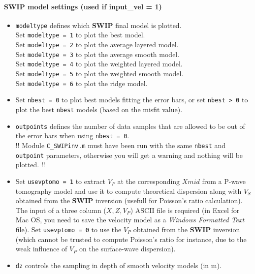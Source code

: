 \documentclass[twoside,a4paper]{article}
\def\SWIP{\textbf{SWIP}}
\begin{document}
\paragraph{SWIP model settings (used if input\_vel = 1)}
\begin{itemize}[leftmargin=*]
\setlength\itemsep{2ex}
\item \verb|modeltype| defines which {\SWIP} final model is plotted.\\[1ex]
Set \verb|modeltype = 1| to plot the best model.\\[1ex]
Set \verb|modeltype = 2| to plot the average layered model.\\[1ex]
Set \verb|modeltype = 3| to plot the average smooth model.\\[1ex]
Set \verb|modeltype = 4| to plot the weighted layered model.\\[1ex]
Set \verb|modeltype = 5| to plot the weighted smooth model.\\[1ex]
Set \verb|modeltype = 6| to plot the ridge model.

\item Set \verb|nbest = 0| to plot best models fitting the error bars, or set \verb|nbest > 0| to plot the best \verb|nbest| models (based on the misfit value). 

\item \verb|outpoints| defines the number of data samples that are allowed to be out of the error bars when using \verb|nbest = 0|.\\[1ex]
!! Module \verb|C_SWIPinv.m| must have been run with the same \verb|nbest| and \verb|outpoint| parameters, otherwise you will get a warning and nothing will be plotted. !!

\item Set \verb|usevptomo = 1| to extract $V_P$ at the corresponding $Xmid$ from a P-wave tomography model and use it to compute theoretical dispersion along with $V_S$ obtained from the {\SWIP} inversion (usefull for Poisson's ratio calculation). The input of a three column ($X,Z,V_P$) ASCII file is required (in Excel for Mac OS, you need to save the velocity model as a \textit{Windows Formatted Text} file). Set \verb|usevptomo = 0| to use the $V_P$ obtained from the {\SWIP} inversion (which cannot be trusted to compute Poisson's ratio for instance, due to the weak influence of $V_P$ on the surface-wave dispersion).

\item \verb|dz| controls the sampling in depth of smooth velocity models (in m).
\end{itemize}
\end{document}
